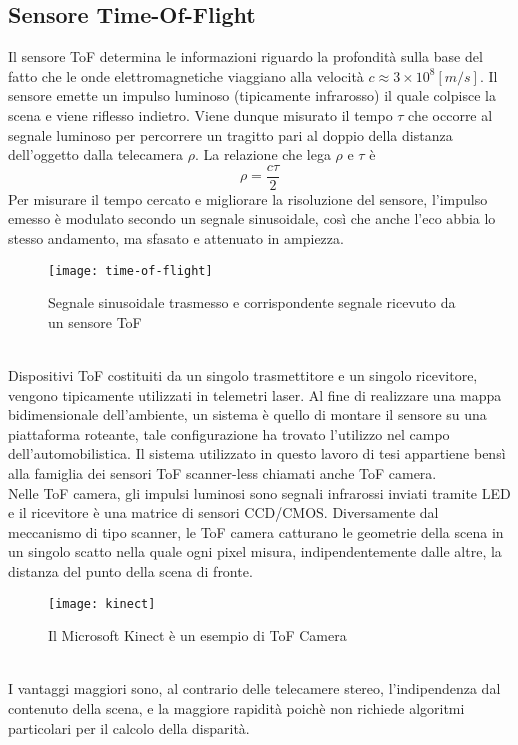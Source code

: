 \subsection{Sensore Time-Of-Flight}
Il sensore ToF determina le informazioni riguardo la profondità sulla base del fatto che le onde elettromagnetiche viaggiano alla velocità \(c\approx3\times 10^8[m/s]\). Il sensore emette un impulso luminoso (tipicamente infrarosso) il quale colpisce la scena e viene riflesso indietro. Viene dunque misurato il tempo $\tau$ che occorre al segnale luminoso per percorrere un tragitto pari al doppio della distanza dell'oggetto dalla telecamera $\rho$. La relazione che lega $\rho$ e $\tau$ è $$\rho=\frac{c\tau}{2}$$
Per misurare il tempo cercato e migliorare la risoluzione del sensore, l'impulso emesso è modulato secondo un segnale sinusoidale, così che anche l'eco abbia lo stesso andamento, ma
sfasato e attenuato in ampiezza.
\begin{figure}[ht]
    \centering
    \texttt{[image: time-of-flight]}
    \caption[Principio time-of-flight]{Segnale sinusoidale trasmesso e corrispondente segnale ricevuto da un sensore ToF}
    \label{tof}
\end{figure}\\
Dispositivi ToF costituiti da un singolo trasmettitore e un singolo ricevitore, vengono tipicamente utilizzati in telemetri laser. Al fine di realizzare una mappa bidimensionale dell'ambiente, un sistema è quello di montare il sensore su una piattaforma roteante, tale configurazione ha trovato l'utilizzo nel campo dell'automobilistica. Il sistema utilizzato in questo lavoro di tesi appartiene bensì alla famiglia dei sensori ToF scanner-less chiamati anche ToF camera.\\
Nelle ToF camera, gli impulsi luminosi sono segnali infrarossi inviati tramite LED e il ricevitore è una matrice di sensori CCD/CMOS. Diversamente dal meccanismo di tipo scanner, le ToF camera catturano le geometrie della scena in un singolo scatto nella quale ogni pixel misura, indipendentemente dalle altre, la distanza del punto della scena di fronte.
\begin{figure}[ht]
    \centering
    \texttt{[image: kinect]}
    \caption[Microsoft kinect]{Il Microsoft Kinect è un esempio di ToF Camera}
    \label{zed}
\end{figure}\\
I vantaggi maggiori sono, al contrario delle telecamere stereo, l'indipendenza dal contenuto della scena, e la maggiore rapidità poichè non richiede algoritmi particolari per il calcolo della disparità. \\
